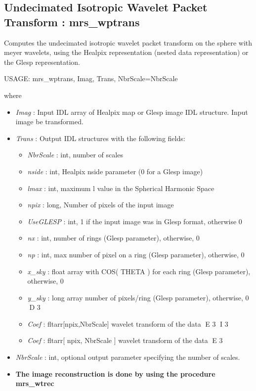 \subsection{Undecimated Isotropic Wavelet Packet Transform : mrs\_wptrans}
Computes the undecimated isotropic wavelet packet transform on the sphere with meyer wavelets, 
using the Healpix representation (nested data representation) or the Glesp representation.
{\bf
\begin{center}
     USAGE: mrs\_wptrans, Imag, Trans, NbrScale=NbrScale
\end{center}}
where
\begin{itemize}
\item {\em Imag} : Input IDL array of Healpix map or Glesp image IDL structure. Input image be transformed. 
\item {\em Trans} : Output IDL structures with the following fields:
\begin{itemize}
\item {\em NbrScale} : int, number of scales
\item {\em nside} : int, Healpix nside parameter (0 for a Glesp image)
\item {\em lmax} : int, maximum l value in the Spherical Harmonic Space
\item {\em npix} : long, Number of pixels of the input image
\item {\em UseGLESP} : int, 1 if the input image was in Glesp format, otherwise 0
\item {\em nx} : int, number of rings (Glesp parameter), otherwise, 0
\item {\em np} : int, max number of pixel on a ring (Glesp parameter), otherwise, 0
\item {\em x\_sky} : float array with COS( THETA ) for each ring (Glesp parameter), otherwise, 0
\item {\em y\_sky} : long array number of pixels/ring (Glesp parameter), otherwise, 0
D 3
\item {\em Coef} : fltarr[npix,NbrScale] wavelet transform of the data
E 3
I 3
\item {\em Coef} : fltarr[ npix, NbrScale ] wavelet transform of the data
E 3
\end{itemize}
\item {\em NbrScale} : int, optional output parameter specifying the number of scales.
\item {\bf The image reconstruction is done by using the procedure mrs\_wtrec}
\end{itemize}

